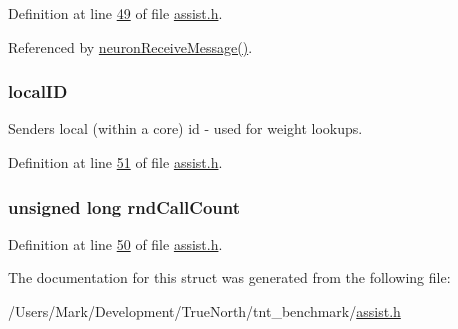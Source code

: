 Definition at line \hyperlink{assist_8h_source_l00049}{49} of file \hyperlink{assist_8h_source}{assist.\+h}.



Referenced by \hyperlink{neuron_8c_source_l00104}{neuron\+Receive\+Message()}.

\hypertarget{struct_msg___data_aefc820e92a74047ec7ed74c1c45f818f}{}
\subsubsection[{local\+I\+D}]{ local\+I\+D}\label{struct_msg___data_aefc820e92a74047ec7ed74c1c45f818f}


Sender\textquotesingle{}s local (within a core) id -\/ used for weight lookups. 



Definition at line \hyperlink{assist_8h_source_l00051}{51} of file \hyperlink{assist_8h_source}{assist.\+h}.

\hypertarget{struct_msg___data_a2e49a6bcc6c45ade722f746b1ea707f2}{}
\subsubsection[{rnd\+Call\+Count}]{\setlength{\rightskip}{0pt plus 5cm}unsigned long rnd\+Call\+Count}\label{struct_msg___data_a2e49a6bcc6c45ade722f746b1ea707f2}


Definition at line \hyperlink{assist_8h_source_l00050}{50} of file \hyperlink{assist_8h_source}{assist.\+h}.



The documentation for this struct was generated from the following file\+:\begin{DoxyCompactItemize}
\item 
/\+Users/\+Mark/\+Development/\+True\+North/tnt\+\_\+benchmark/\hyperlink{assist_8h}{assist.\+h}\end{DoxyCompactItemize}
